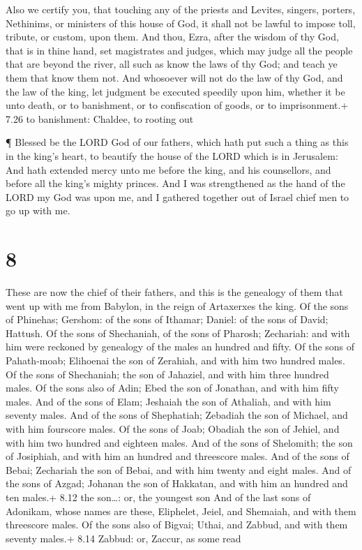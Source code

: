  Also we certify you, that touching any of the priests and
Levites, singers, porters, Nethinims, or ministers of this house of God,
it shall not be lawful to impose toll, tribute, or custom, upon them.
 And thou, Ezra, after the wisdom of thy God, that is in
thine hand, set magistrates and judges, which may judge all the people
that are beyond the river, all such as know the laws of thy God; and
teach ye them that know them not.  And whosoever will not
do the law of thy God, and the law of the king, let judgment be executed
speedily upon him, whether it be unto death, or to banishment, or to
confiscation of goods, or to imprisonment.+ 7.26 to banishment: Chaldee,
to rooting out

 ¶ Blessed be the LORD God of our fathers, which hath put
such a thing as this in the king's heart, to beautify the house of the
LORD which is in Jerusalem:  And hath extended mercy unto
me before the king, and his counsellors, and before all the king's
mighty princes. And I was strengthened as the hand of the LORD my God
was upon me, and I gathered together out of Israel chief men to go up
with me.

\hypertarget{section-7}{%
\section{8}\label{section-7}}

 These are now the chief of their fathers, and this is the
genealogy of them that went up with me from Babylon, in the reign of
Artaxerxes the king.  Of the sons of Phinehas; Gershom: of
the sons of Ithamar; Daniel: of the sons of David; Hattush. 
Of the sons of Shechaniah, of the sons of Pharosh; Zechariah: and with
him were reckoned by genealogy of the males an hundred and fifty.
 Of the sons of Pahath-moab; Elihoenai the son of Zerahiah,
and with him two hundred males.  Of the sons of Shechaniah;
the son of Jahaziel, and with him three hundred males.  Of
the sons also of Adin; Ebed the son of Jonathan, and with him fifty
males.  And of the sons of Elam; Jeshaiah the son of
Athaliah, and with him seventy males.  And of the sons of
Shephatiah; Zebadiah the son of Michael, and with him fourscore males.
 Of the sons of Joab; Obadiah the son of Jehiel, and with
him two hundred and eighteen males.  And of the sons of
Shelomith; the son of Josiphiah, and with him an hundred and threescore
males.  And of the sons of Bebai; Zechariah the son of
Bebai, and with him twenty and eight males.  And of the
sons of Azgad; Johanan the son of Hakkatan, and with him an hundred and
ten males.+ 8.12 the son\ldots: or, the youngest son  And
of the last sons of Adonikam, whose names are these, Eliphelet, Jeiel,
and Shemaiah, and with them threescore males.  Of the sons
also of Bigvai; Uthai, and Zabbud, and with them seventy males.+ 8.14
Zabbud: or, Zaccur, as some read

